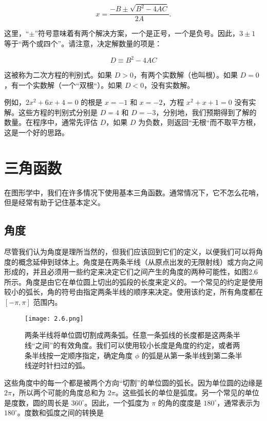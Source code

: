 \documentclass[lang=cn,12pt]{elegantbook}
\begin{document}
\begin{equation} x=\frac{-B \pm \sqrt{B^{2}-4 A C}}{2 A} . \end{equation}

这里，“$\pm$”符号意味着有两个解决方案，一个是正号，一个是负号。因此，$3\pm1$ 等于“两个或四个”。请注意，决定解数量的项是：

$$
D \equiv B^{2}-4 A C
$$

这被称为二次方程的判别式。如果 $D>0$，有两个实数解（也叫根）。如果 $D=0$，有一个实数解（一个``双根“）。如果 $D<0$，没有实数解。

例如，$2x^2+6x+4=0$ 的根是 $x=-1$ 和 $x=-2$，方程 $x^2+x+1=0$ 没有实解。这些方程的判别式分别是 $D=4$ 和 $D=-3$，分别地，我们预期得到了解的数量。在程序中，通常先评估 $D$，如果 $D$ 为负数，则返回``无根“而不取平方根，这是一个好的思路。

\section{三角函数}

在图形学中，我们在许多情况下使用基本三角函数。通常情况下，它不怎么花哨，但是经常有助于记住基本定义。

\subsection{角度}

尽管我们认为角度是理所当然的，但我们应该回到它们的定义，以便我们可以将角度的概念延伸到球体上。角度是在两条半线（从原点出发的无限射线）或方向之间形成的，并且必须用一些约定来决定它们之间产生的角度的两种可能性，如图2.6所示。角度是由它在单位圆上切出的弧段的长度来定义的。一个常见的约定是使用较小的弧长，角的符号由指定两条半线的顺序来决定。使用该约定，所有角度都在 $[-\pi, \pi]$ 范围内。

\begin{figure}[htbp]
\centering
\texttt{[image: 2.6.png]}
\caption{两条半线将单位圆切割成两条弧。任意一条弧线的长度都是这两条半线“之间”的有效角度。我们可以使用较小长度是角度的约定，或者两条半线按一定顺序指定，确定角度 $\phi$ 的弧是从第一条半线到第二条半线逆时针扫过的弧。}
\end{figure}

这些角度中的每一个都是被两个方向“切割”的单位圆的弧长。因为单位圆的边缘是 $2\pi$，所以两个可能的角度总和为 $2\pi$。这些弧长的单位是弧度。另一个常见的单位是度数，圆的周长是 $360^\circ$。因此，一个弧度为 $\pi$ 的角的度度是 $180^\circ$，通常表示为 $180^\circ$。度数和弧度之间的转换是
\end{document}
